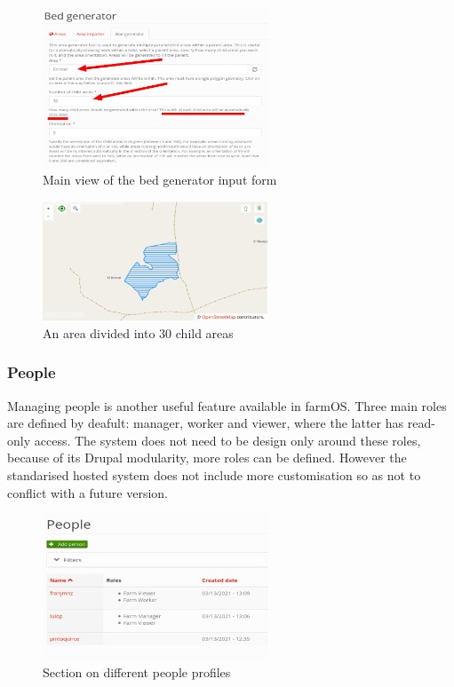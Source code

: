 \begin{figure}[H]
    \centering
    \includegraphics[width=0.60\textwidth]{fig/bed_gen.png}
    \caption{Main view of the bed generator input form}
    \label{fig:bed_gen}
\end{figure}

\begin{figure}[H]
    \centering
    \includegraphics[width=0.60\textwidth]{fig/bed_gen_example.png}
    \caption{An area divided into 30 child areas}
    \label{fig:bed_gen}
\end{figure}


\subsubsection{People}
Managing people is another useful feature available in farmOS. Three main roles are defined by deafult: manager, worker and viewer,  where the latter has read-only access. The system does not need to be design only around these roles, because of its Drupal modularity, more roles can be defined. However the standarised hosted system does not include more customisation so as not to conflict with a future version.


\begin{figure}[H]
    \centering
    \includegraphics[width=0.6\textwidth]{fig/people.png}
    \caption{Section on different people profiles}
    \label{fig:people}
\end{figure}

